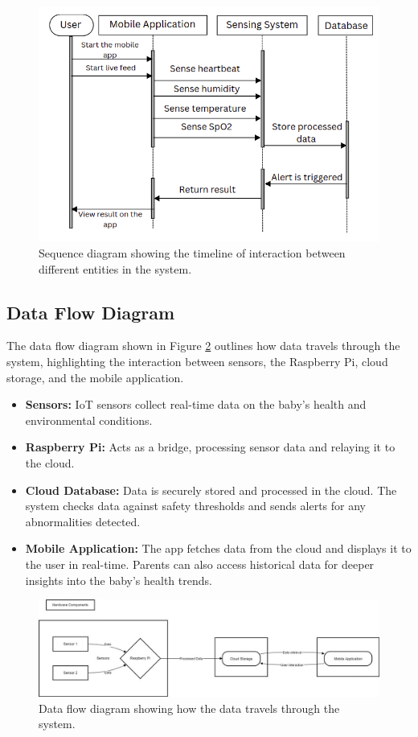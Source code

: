 \documentclass[12pt,a4paper]{report}
\begin{document}
\begin{figure}[hbtp]
  \centering
  \includegraphics[scale=0.6]{./pic/sequence.png}
  \caption{Sequence diagram showing the timeline of interaction between different entities in the system.}
  \label{fig:sequence}
\end{figure}


\subsection{Data Flow Diagram}
The data flow diagram shown in Figure \ref{fig:dataflow} outlines how data travels through the system, highlighting the interaction between sensors, the Raspberry Pi, cloud storage, and the mobile application.

\begin{itemize}
  \item \textbf{Sensors:} IoT sensors collect real-time data on the baby’s health and environmental conditions.
  \item \textbf{Raspberry Pi:} Acts as a bridge, processing sensor data and relaying it to the cloud.
  \item \textbf{Cloud Database:} Data is securely stored and processed in the cloud. The system checks data against safety thresholds and sends alerts for any abnormalities detected.
  \item \textbf{Mobile Application:} The app fetches data from the cloud and displays it to the user in real-time. Parents can also access historical data for deeper insights into the baby’s health trends.
\end{itemize}

\begin{figure}[hbtp]
  \centering
  \includegraphics[scale=0.35]{./pic/WhatsApp Image 2024-10-23 at 22.00.55_66baa9c8.jpg}
  \caption{Data flow diagram showing how the data travels through the system.}
  \label{fig:dataflow}
\end{figure}
\end{document}
